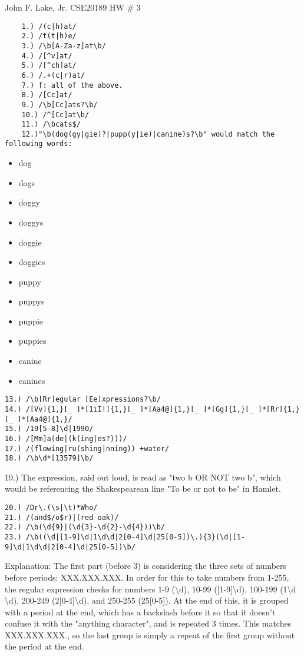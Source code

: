 


John F. Lake, Jr. 
CSE20189 HW \# 3

\begin{verbatim}
	1.) /(c|h)at/
	2.) /t(t|h)e/
	3.) /\b[A-Za-z]at\b/
	4.) /[^v]at/
	5.) /[^ch]at/
	6.) /.+(c|r)at/
	7.) f: all of the above. 
	8.) /[Cc]at/
	9.) /\b[Cc]ats?\b/
	10.) /^[Cc]at\b/
	11.) /\bcats$/
	12.)"\b(dog(gy|gie)?|pupp(y|ie)|canine)s?\b" would match the following words: 
\end{verbatim}
\begin{itemize}
	\item dog
	\item dogs
	\item doggy
	\item doggys
	\item doggie
	\item doggies
	\item puppy
	\item puppys
	\item puppie
	\item puppies
	\item canine
	\item canines	
\end{itemize}
\begin{verbatim}
13.) /\b[Rr]egular [Ee]xpressions?\b/
14.) /[Vv]{1,}[_ ]*[1iI!]{1,}[_ ]*[Aa4@]{1,}[_ ]*[Gg]{1,}[_ ]*[Rr]{1,}[_ ]*[Aa4@]{1,}/
15.) /19[5-8]\d|1990/
16.) /[Mm]a(de|(k(ing|es?)))/
17.) /(flowing|ru(shing|nning)) +water/
18.) /\b\d*[13579]\b/
\end{verbatim}	
19.) The expression, said out loud, is read as "two b OR NOT two b", which would be referencing the Shakespearean line "To be or not to be" in Hamlet.  
\begin{verbatim}
20.) /Dr\.(\s|\t)*Who/
21.) /(and$/o$r)|(red oak)/
22.) /\b(\d{9}|(\d{3}-\d{2}-\d{4}))\b/
23.) /\b((\d|[1-9]\d|1\d\d|2[0-4]\d|25[0-5])\.){3}(\d|[1-9]\d|1\d\d|2[0-4]\d|25[0-5])\b/
\end{verbatim} 
Explanation:  The first part (before {3}) is considering the three sets of numbers before periods: XXX.XXX.XXX. In order for this to take
numbers from 1-255, the regular expression checks for numbers 1-9 (\textbackslash d), 10-99 ([1-9]\textbackslash d), 100-199 
(1\textbackslash d \textbackslash d), 200-249 (2[0-4]\textbackslash d), 
and 250-255 (25[0-5]).  At the end of this, it is grouped with a period at the end, which has a backslash before it so that it doesn't confuse 
it with the "anything character", and is repeated 3 times.  This matches XXX.XXX.XXX., so the 
last group is simply a repeat of the first group without the period at the end.  


	


